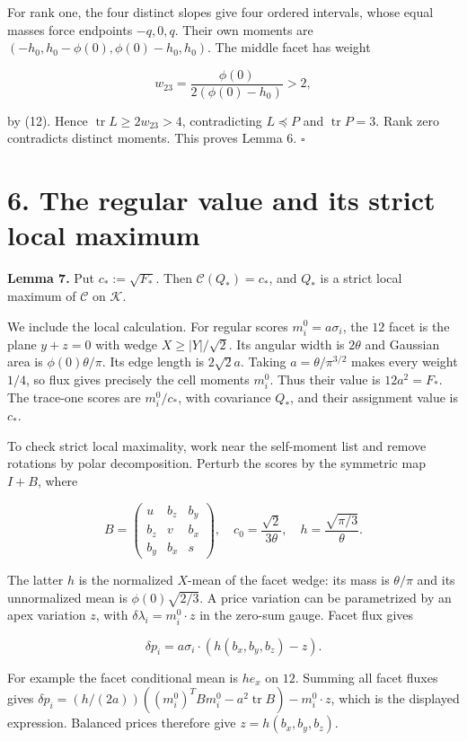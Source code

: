 \documentclass[
  11pt,
]{article}
\begin{document}
For rank one, the four distinct slopes give four ordered intervals,
whose equal masses force endpoints \(-q,0,q\). Their own moments are
\((-h_0,h_0-\phi(0),\phi(0)-h_0,h_0)\). The middle facet has weight

\[
 w_{23}=\frac{\phi(0)}{2(\phi(0)-h_0)}>2,
\]

by (12). Hence \(\operatorname{tr}L\ge2w_{23}>4\), contradicting
\(L\preceq P\) and \(\operatorname{tr}P=3\). Rank zero contradicts
distinct moments. This proves Lemma 6. \(\square\)

\section{6. The regular value and its strict local
maximum}\label{the-regular-value-and-its-strict-local-maximum}

\textbf{Lemma 7.} Put \(c_*:=\sqrt{F_*}\). Then \(\mathcal C(Q_*)=c_*\),
and \(Q_*\) is a strict local maximum of \(\mathcal C\) on
\(\mathcal K\).

We include the local calculation. For regular scores
\(m_i^0=a\sigma_i\), the \(12\) facet is the plane \(y+z=0\) with wedge
\(X\ge|Y|/\sqrt2\). Its angular width is \(2\theta\) and Gaussian area
is \(\phi(0)\theta/\pi\). Its edge length is \(2\sqrt2 a\). Taking
\(a=\theta/\pi^{3/2}\) makes every weight \(1/4\), so flux gives
precisely the cell moments \(m_i^0\). Thus their value is \(12a^2=F_*\).
The trace-one scores are \(m_i^0/c_*\), with covariance \(Q_*\), and
their assignment value is \(c_*\).

To check strict local maximality, work near the self-moment list and
remove rotations by polar decomposition. Perturb the scores by the
symmetric map \(I+B\), where

\[
 B=\begin{pmatrix}u&b_z&b_y\\b_z&v&b_x\\b_y&b_x&s\end{pmatrix},
 \quad c_0=\frac{\sqrt2}{3\theta},\quad
 h=\frac{\sqrt{\pi/3}}{\theta}.
\]

The latter \(h\) is the normalized \(X\)-mean of the facet wedge: its
mass is \(\theta/\pi\) and its unnormalized mean is
\(\phi(0)\sqrt{2/3}\). A price variation can be parametrized by an apex
variation \(z\), with \(\delta\lambda_i=m_i^0\cdot z\) in the zero-sum
gauge. Facet flux gives

\[
 \delta p_i=a\sigma_i\cdot(h(b_x,b_y,b_z)-z).
\]

For example the facet conditional mean is \(he_x\) on \(12\). Summing
all facet fluxes gives
\(\delta p_i=(h/(2a))((m_i^0)^TBm_i^0-a^2\operatorname{tr}B)-m_i^0\cdot z\),
which is the displayed expression. Balanced prices therefore give
\(z=h(b_x,b_y,b_z)\).
\end{document}
